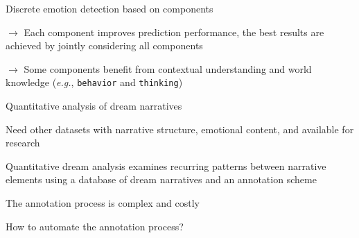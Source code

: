 \documentclass[handout,10pt]{beamer}
\begin{document}
\begin{frame}{Discrete emotion detection based on components}
\vspace{0.25cm}
\pause

$\rightarrow$ Each component improves prediction performance, the best results are achieved by jointly considering all components

\vspace{0.25cm}
\pause

$\rightarrow$ Some components benefit from contextual understanding and world knowledge (\textit{e.g.}, \texttt{behavior} and \texttt{thinking})

\end{frame}

\begin{frame}{Quantitative analysis of dream narratives}


Need other datasets with narrative structure, emotional content, and available for research

\vspace{0.5cm}
\pause

Quantitative dream analysis examines recurring patterns between narrative elements using a database of dream narratives and an annotation scheme \citep{domhoffStudyingDreamContent2008b}

\vspace{0.5cm}
\pause

The annotation process is complex and costly

\vspace{0.5cm}
\pause

How to automate the annotation process?

    
\end{frame}
\end{document}
